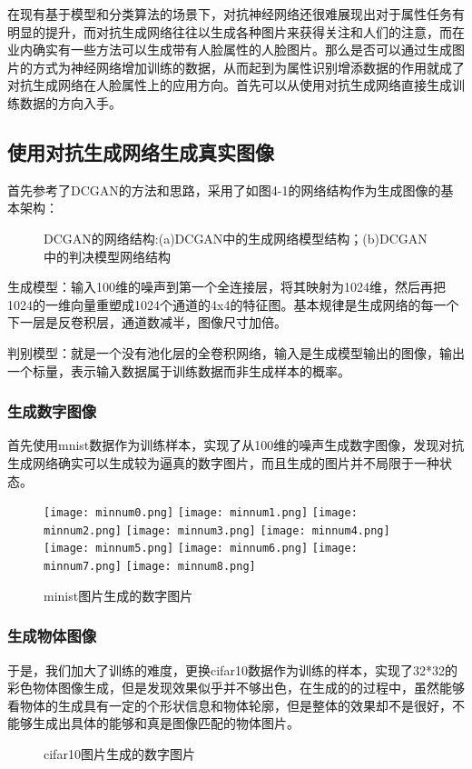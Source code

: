 在现有基于模型和分类算法的场景下，对抗神经网络还很难展现出对于属性任务有明显的提升，而对抗生成网络往往以生成各种图片来获得关注和人们的注意，而在业内确实有一些方法可以生成带有人脸属性的人脸图片。那么是否可以通过生成图片的方式为神经网络增加训练的数据，从而起到为属性识别增添数据的作用就成了对抗生成网络在人脸属性上的应用方向。首先可以从使用对抗生成网络直接生成训练数据的方向入手。
\subsection{使用对抗生成网络生成真实图像}
首先参考了DCGAN\cite{DCGAN}的方法和思路，采用了如图4-1的网络结构作为生成图像的基本架构：
\begin{figure}[h]
  \centering
  \caption{DCGAN的网络结构:(a)DCGAN中的生成网络模型结构；(b)DCGAN中的判决模型网络结构}
\end{figure}
生成模型：输入100维的噪声到第一个全连接层，将其映射为1024维，然后再把1024的一维向量重塑成1024个通道的4x4的特征图。基本规律是生成网络的每一个下一层是反卷积层，通道数减半，图像尺寸加倍。

判别模型：就是一个没有池化层的全卷积网络，输入是生成模型输出的图像，输出一个标量，表示输入数据属于训练数据而非生成样本的概率。


\subsubsection{生成数字图像}
首先使用mnist数据\cite{MNIST}作为训练样本，实现了从100维的噪声生成数字图像，发现对抗生成网络确实可以生成较为逼真的数字图片，而且生成的图片并不局限于一种状态。
\begin{figure}[!ht]
 \centering 
	\texttt{[image: minnum0.png]}
	\texttt{[image: minnum1.png]}
	\texttt{[image: minnum2.png]}
	\texttt{[image: minnum3.png]}
	\texttt{[image: minnum4.png]}
	\texttt{[image: minnum5.png]}
	\texttt{[image: minnum6.png]}
	\texttt{[image: minnum7.png]}
	\texttt{[image: minnum8.png]}
	\caption{minist图片生成的数字图片}
\end{figure}

\subsubsection{生成物体图像}
于是，我们加大了训练的难度，更换cifar10\cite{CIFAR10}数据作为训练的样本，实现了32*32的彩色物体图像生成，但是发现效果似乎并不够出色，在生成的的过程中，虽然能够看物体的生成具有一定的个形状信息和物体轮廓，但是整体的效果却不是很好，不能够生成出具体的能够和真是图像匹配的物体图片。
\begin{figure}[h]
 \centering 
	\caption{cifar10图片生成的数字图片}
\end{figure}

